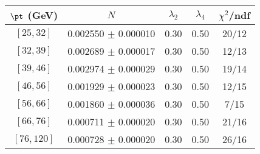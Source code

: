 \begin{tabular}{c||c|c|c|c}
$\pt$ (GeV) & $N$ & $\lambda_{2}$ & $\lambda_4$  & $\chi^2$/ndf  \\
\hline
$[25, 32]$ & 0.002550 $\pm$ 0.000010 & 0.30 & 0.50 & 20/12\\
$[32, 39]$ & 0.002689 $\pm$ 0.000017 & 0.30 & 0.50 & 12/13\\
$[39, 46]$ & 0.002974 $\pm$ 0.000029 & 0.30 & 0.50 & 19/14\\
$[46, 56]$ & 0.001929 $\pm$ 0.000023 & 0.30 & 0.50 & 12/15\\
$[56, 66]$ & 0.001860 $\pm$ 0.000036 & 0.30 & 0.50 & 7/15\\
$[66, 76]$ & 0.000711 $\pm$ 0.000020 & 0.30 & 0.50 & 21/16\\
$[76, 120]$ & 0.000728 $\pm$ 0.000020 & 0.30 & 0.50 & 26/16\\
\end{tabular}
